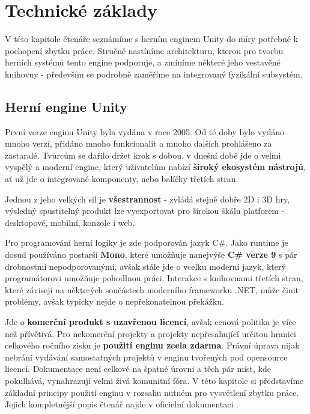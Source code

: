 \chapter{Technické základy}

V této kapitole čtenáře seznámíme s herním enginem Unity \cite{Unity} do míry potřebné k pochopení zbytku práce. Stručně nastíníme architekturu, kterou pro tvorbu herních systémů tento engine podporuje, a zmíníme některé jeho vestavěné knihovny - především se podrobně zaměříme na integrovaný fyzikální subsystém.


\section{Herní engine Unity} \label{unityEngineIntroSection}

První verze enginu Unity byla vydána v roce 2005. Od té doby bylo vydáno mnoho verzí, přidáno mnoho funkcionalit a mnoho dalších prohlášeno za zastaralé. Tvůrcům se dařilo držet krok s dobou, v dnešní době jde o velmi vyspělý a moderní engine, který uživatelům nabízí \textbf{široký ekosystém nástrojů}, ať už jde o integrované komponenty, nebo balíčky třetích stran. 

Jednou z jeho velkých sil je \textbf{všestrannost} - zvládá stejně dobře 2D i 3D hry, výsledný spustitelný produkt lze vyexportovat pro širokou škálu platforem - desktopové, mobilní, konzole i web.

Pro programování herní logiky je zde podporován jazyk C\#. Jako runtime je dosud používáno postarší \textbf{Mono}, které umožňuje nanejvýše \textbf{C\# verze 9} s pár drobnostmi nepodporovanými, avšak stále jde o vcelku moderní jazyk, který programátorovi umožňuje pohodlnou práci. Interakce s knihovnami třetích stran, které závisejí na některých součástech moderního frameworku .NET, může činit problémy, avšak typicky nejde o nepřekonatelnou překážku.

Jde o \textbf{komerční produkt s uzavřenou licencí}, avšak cenová politika je více než přívětivá. Pro nekomerční projekty a projekty nepřesahující určitou hranici celkového ročního zisku je \textbf{použití enginu zcela zdarma}. Právní úprava nijak nebrání vydávání samostatných projektů v enginu tvořených pod opensource licencí. Dokumentace není celkově na špatné úrovni a těch pár míst, kde pokulhává, vynahrazují velmi živá komunitní fóra.
\bigbreak
V této kapitole si představíme základní principy použití enginu v rozsahu nutném pro vysvětlení zbytku práce. Jejich kompletnější popis čtenář najde v oficielní dokumentaci \cite{Unity}. 

